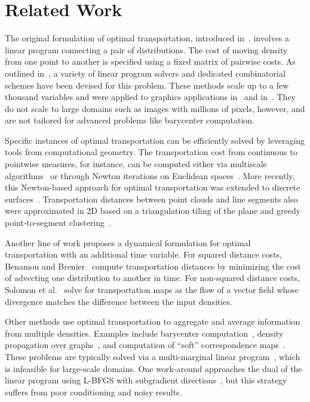 
\section{Related Work}

The original formulation of optimal transportation, introduced in~\cite{Kantorovich42}, involves a linear program connecting a pair of distributions.  The cost of moving density from one point to another is specified using a fixed matrix of pairwise costs. As outlined in~\cite{Burkard09}, a variety of linear program solvers and dedicated combinatorial schemes have been devised for this problem.  These methods scale up to a few thousand variables and were applied to graphics applications in~\cite{bonneel-2011} and in~\cite{lipman-2011}.  They do not scale to large domains such as images with millions of pixels, however, and are not tailored for advanced problems like barycenter computation. 

Specific instances of optimal transportation can be efficiently solved by leveraging tools from computational geometry.  The transportation cost from continuous to pointwise measures, for instance, can be computed either via multiscale algorithms~\cite{Merigot2011,schwartzburg-2014} or through Newton iterations on Euclidean spaces~\cite{degoes-2012,Zhao-2013}.  More recently, this Newton-based approach for optimal transportation was extended to discrete surfaces~\cite{degoes-2014}.  Transportation distances between point clouds and line segments also were approximated in 2D based on a triangulation tiling of the plane and greedy point-to-segment clustering~\cite{degoes-2011}.

Another line of work proposes a dynamical formulation for optimal transportation with an additional time variable.  For squared distance costs, Benamou and Brenier~ compute transportation distances by minimizing the cost of advecting one distribution to another in time.
For non-squared distance costs, Solomon et al.~ solve for transportation maps as the flow of a vector field whose divergence matches the difference between the input densities.

Other methods use optimal transportation to aggregate and average information from multiple densities.  Examples include barycenter computation~\cite{agueh-2011}, density propagation over graphs~\cite{solomon-2014-2}, and computation of ``soft'' correspondence maps~\cite{solomon-2012}.   These problems are typically solved via a multi-marginal linear program~\cite{agueh-2011,kim-2013}, which  is infeasible for large-scale domains.   One work-around approaches the dual of the linear program using L-BFGS with subgradient directions~\cite{Carlier-NumericsBarycenters}, but this strategy suffers from poor conditioning and noisy results.

